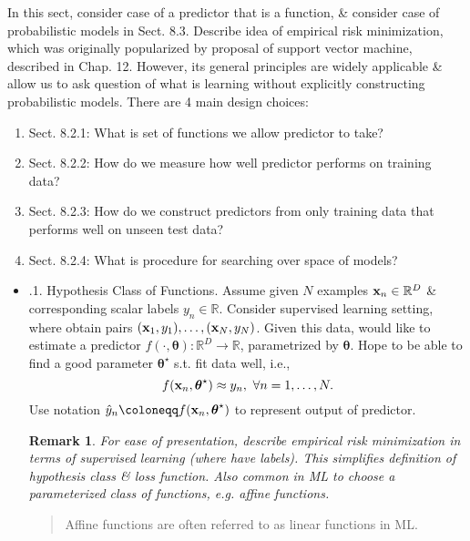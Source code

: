 \documentclass{article}
\newtheorem{remark}{Remark}
\begin{document}
\begin{enumerate}
\begin{itemize}
\begin{itemize}
			In this sect,  consider case of a predictor that is a function, \& consider case of probabilistic models in Sect. 8.3. Describe idea of empirical risk minimization, which was originally popularized by proposal of support vector machine, described in Chap. 12. However, its general principles are widely applicable \& allow us to ask question of what is learning without explicitly constructing probabilistic models. There are 4 main design choices:
			\begin{enumerate}
				\item Sect. 8.2.1: What is set of functions we allow predictor to take?
				\item Sect. 8.2.2: How do we measure how well predictor performs on training data?
				\item Sect. 8.2.3: How do we construct predictors from only training data that performs well on unseen test data?
				\item Sect. 8.2.4: What is procedure for searching over space of models?
			\end{enumerate}
			
			\begin{itemize}
				\item {.1. Hypothesis Class of Functions.} Assume given $N$ examples ${\bf x}_n\in\mathbb{R}^D$ \& corresponding scalar labels $y_n\in\mathbb{R}$. Consider supervised learning setting, where obtain pairs $({\bf x}_1,y_1),\ldots,({\bf x}_N,y_N)$. Given this data, would like to estimate a predictor $f(\cdot,\boldsymbol{\theta}):\mathbb{R}^D\to\mathbb{R}$, parametrized by $\boldsymbol{\theta}$. Hope to be able to find a good parameter $\boldsymbol{\theta}^\star$ s.t. fit data well, i.e.,
				\begin{equation}
					f({\bf x}_n,\boldsymbol{\theta}^\star)\approx y_n,\ \forall n = 1,\ldots,N.
				\end{equation}
				Use notation $\hat{y}_n\coloneqq f({\bf x}_n,\boldsymbol{\theta}^\star)$ to represent output of predictor.
				\begin{remark}
					For ease of presentation, describe empirical risk minimization in terms of supervised learning (where have labels). This simplifies definition of hypothesis class \& loss function. Also common in ML to choose a parameterized class of functions, e.g. affine functions.
				\end{remark}
				
				\begin{quote}
					Affine functions are often referred to as linear functions in ML.
				\end{quote}
				

\end{itemize}
\end{itemize}
\end{itemize}
\end{enumerate}
\end{document}
